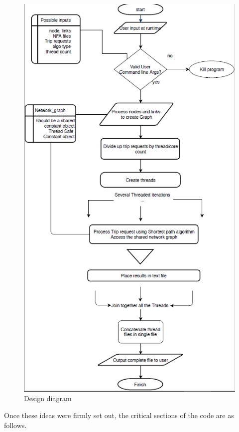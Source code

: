 \documentclass[English]{article}
\theoremstyle{remark}
\numberwithin{equation}{section}
\begin{document}
\begin{figure}[H]
    \centering
    \includegraphics[scale = 0.5]{design.png}
    \caption{Design diagram}
    \label{fig:design1}
\end{figure}

Once these ideas were firmly set out, the critical sections of the code are as follows.
\end{document}

